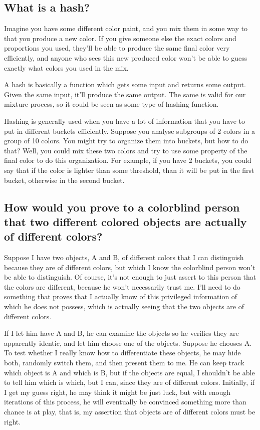 \documentclass{article}
\begin{document}
\subsection*{What is a hash?}

Imagine you have some different color paint, and you mix them in some way to that you produce a new color. If you give someone else the exact colors and proportions you used, they'll be able to produce the same final color very efficiently, and anyone who sees this new produced color won't be able to guess exactly what colors you used in the mix.

A hash is basically a function which gets some input and returns some output. Given the same input, it'll produce the same output. The same is valid for our mixture process, so it could be seen as some type of hashing function.

Hashing is generally used when you have a lot of information that you have to put in different buckets efficiently. Suppose you analyse subgroups of 2 colors in a group of 10 colors. You might try to organize them into buckets, but how to do that? Well, you could mix these two colors and try to use some property of the final color to do this organization. For example, if you have 2 buckets, you could say that if the color is lighter than some threshold, than it will be put in the first bucket, otherwise in the second bucket.

\subsection*{How would you prove to a colorblind person that two different colored objects are actually of different colors?}

Suppose I have two objects, A and B, of different colors that I can distinguish because they are of different colors, but which I know the colorblind person won't be able to distinguish. Of course, it's not enough to just assert to this person that the colors are different, because he won't necessarily trust me. I'll need to do something that proves that I actually know of this privileged information of which he does not possess, which is actually seeing that the two objects are of different colors.

If I let him have A and B, he can examine the objects so he verifies they are apparently identic, and let him choose one of the objects. Suppose he chooses A. To test whether I really know how to differentiate these objects, he may hide both, randomly switch them, and then present them to me. He can keep track which object is A and which is B, but if the objects are equal, I shouldn't be able to tell him which is which, but I can, since they are of different colors. Initially, if I get my guess right, he may think it might be just luck, but with enough iterations of this process, he will eventually be convinced something more than chance is at play, that is, my assertion that objects are of different colors must be right.
\end{document}
